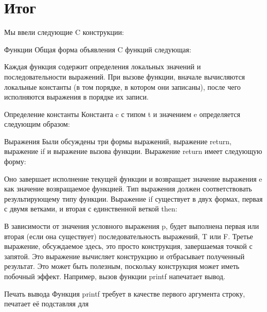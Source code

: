 


\section{Итог}

Мы ввели следующие C конструкции:

Функции Общая форма объявления C функций следующая:

Каждая функция содержит определения локальных значений и последовательности выражений. При вызове функции, вначале вычисляются локальные константы (в том порядке, в котором они записаны), после чего исполняются выражения в порядке их записи.

Определение константы Константа c с типом t и значением e определяется следующим образом:

Выражения Были обсуждены три формы выражений, выражение return, выражение if и выражение вызова функции. Выражение return имеет следующую форму:

Оно завершает исполнение текущей функции и возвращает значение выражения e как значение возвращаемое функцией. Тип выражения должен соответствовать результирующему типу функции. Выражение if существует в двух формах, первая с двумя ветками, и вторая с единственной веткой then:

В зависимости от значения условного выражения p, будет выполнена первая или вторая (если она существует) последовательность выражений, T или F. Третье выражение, обсуждаемое здесь, это просто конструкция, завершаемая точкой с запятой. Это выражение вычисляет конструкцию и отбрасывает полученный результат. Это может быть полезным, поскольку конструкция может иметь побочный эффект. Например, вызов функции printf напечатает вывод.

Печать вывода Функция printf требует в качестве первого аргумента строку, печатает её подставляя для %

